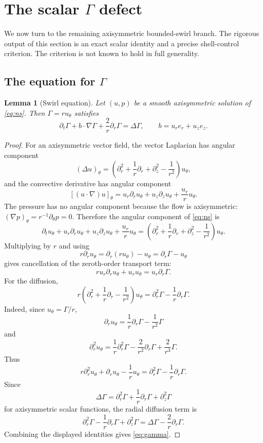 \documentclass[11pt]{amsart}
\theoremstyle{plain}
\newtheorem{lemma}[theorem]{Lemma}
\theoremstyle{definition}
\theoremstyle{remark}
\numberwithin{equation}{section}
\begin{document}
\section{The scalar \texorpdfstring{\(\Gamma\)}{Gamma} defect}

We now turn to the remaining axisymmetric bounded-swirl branch.  The rigorous
output of this section is an exact scalar identity and a precise shell-control
criterion.  The criterion is not known to hold in full generality.

\subsection{The equation for \texorpdfstring{\(\Gamma\)}{Gamma}}

\begin{lemma}[Swirl equation]\label{lem:gamma-equation}
Let \((u,p)\) be a smooth axisymmetric solution of \eqref{eq:ns}.  Then
\(\Gamma=ru_\theta\) satisfies
\begin{equation}\label{eq:gamma}
   \partial_t\Gamma+b\cdot\nabla\Gamma+\frac2r\partial_r\Gamma
   =
   \Delta\Gamma,
   \qquad b=u_r e_r+u_z e_z .
\end{equation}
\end{lemma}

\begin{proof}
For an axisymmetric vector field, the vector Laplacian has angular component
\[
   (\Delta u)_\theta
   =
   \left(\partial_r^2+\frac1r\partial_r+\partial_z^2-\frac1{r^2}\right)
   u_\theta ,
\]
and the convective derivative has angular component
\[
   [(u\cdot\nabla)u]_\theta
   =
   u_r\partial_r u_\theta+u_z\partial_z u_\theta+\frac{u_r}{r}u_\theta .
\]
The pressure has no angular component because the flow is axisymmetric:
\((\nabla p)_\theta=r^{-1}\partial_\theta p=0\).  Therefore the angular
component of \eqref{eq:ns} is
\[
   \partial_tu_\theta+u_r\partial_r u_\theta+u_z\partial_z u_\theta
   +\frac{u_r}{r}u_\theta
   =
   \left(\partial_r^2+\frac1r\partial_r+\partial_z^2-\frac1{r^2}\right)
   u_\theta .
\]
Multiplying by \(r\) and using
\[
   r\partial_r u_\theta=\partial_r(ru_\theta)-u_\theta
   =\partial_r\Gamma-u_\theta
\]
gives cancellation of the zeroth-order transport term:
\[
   r u_r\partial_r u_\theta+u_r u_\theta
   =
   u_r\partial_r\Gamma .
\]
For the diffusion,
\[
   r\left(\partial_r^2+\frac1r\partial_r-\frac1{r^2}\right)u_\theta
   =
   \partial_r^2\Gamma-\frac1r\partial_r\Gamma .
\]
Indeed, since \(u_\theta=\Gamma/r\),
\[
   \partial_r u_\theta
   =
   \frac1r\partial_r\Gamma-\frac1{r^2}\Gamma
\]
and
\[
   \partial_r^2u_\theta
   =
   \frac1r\partial_r^2\Gamma
   -\frac2{r^2}\partial_r\Gamma
   +\frac2{r^3}\Gamma .
\]
Thus
\[
   r\partial_r^2u_\theta+\partial_r u_\theta-\frac1r u_\theta
   =
   \partial_r^2\Gamma-\frac1r\partial_r\Gamma .
\]
Since
\[
   \Delta\Gamma
   =
   \partial_r^2\Gamma+\frac1r\partial_r\Gamma+\partial_z^2\Gamma
\]
for axisymmetric scalar functions, the radial diffusion term is
\[
   \partial_r^2\Gamma-\frac1r\partial_r\Gamma+\partial_z^2\Gamma
   =
   \Delta\Gamma-\frac2r\partial_r\Gamma .
\]
Combining the displayed identities gives \eqref{eq:gamma}.
\end{proof}
\end{document}
